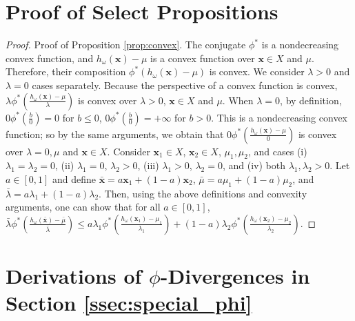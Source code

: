 \documentclass[opre,nonblindrev]{informs3} %
\newcommand{\x}{\mathbf{x}}
\begin{document}
%
 \begin{APPENDICES}

	\section{Proof of Select Propositions}

\begin{proof}{\sc Proof of Proposition \ref{prop:convex}.}
	The conjugate $\phi^*$ is a nondecreasing convex function, and $h_\omega(\x)-\mu$ is a convex function over $\x \in X$ and $\mu$. 
	Therefore, their composition  $\phi^*\left(h_\omega(\x)-\mu\right)$ is convex. 
	We consider $\lambda>0$ and $\lambda =0$ cases separately. 
	Because the perspective of a convex function is convex, $\lambda\phi^*\left(\frac{h_\omega(\x)-\mu}{\lambda}\right)$ is convex over $\lambda>0$,  $\x \in X$ and $\mu$. 
	When $\lambda = 0$, by definition, $0\phi^*\left(\frac{b}{0}\right)= 0$ for $b \leq 0$, $0\phi^*\left(\frac{b}{0}\right)= +\infty$ for $b>0$.  
	This is a nondecreasing convex function; so by the same arguments, we obtain that  $0\phi^*\left(\frac{h_\omega(\x)-\mu}{0}\right)$ is convex over $\lambda=0, \mu$ and $\x \in X$. 
	Consider $\x_1 \in X$, $\x_2 \in X$, $\mu_1,\mu_2$, and cases (i) $\lambda_1=\lambda_2 = 0$, (ii) $\lambda_1= 0$, $\lambda_2>0$, (iii) $\lambda_1 >0$, $\lambda_2 =0$, and (iv) both $\lambda_1, \lambda_2>0$.  
	Let $a \in [0,1]$ and define $\bar{\x}=a \x_1 + (1-a) \x_2$, $\bar{\mu}=a\mu_1 + (1-a)\mu_2$, and $\bar{\lambda}=a \lambda_1 + (1-a)\lambda_2$. 
	Then, using the above definitions and convexity arguments, one can show that for all $a \in [0,1]$, $\bar{\lambda} \phi^*\left(\frac{h_\omega(\bar{\x}) - \bar{\mu}}{\bar{\lambda}}\right) \leq a \lambda_1 \phi^*\left(\frac{h_\omega(\x_1) - \mu_1}{\lambda_1}\right) + (1-a) \lambda_2 \phi^*\left(\frac{h_\omega(\x_2) - \mu_2}{\lambda_2}\right)$.
	\Halmos
\end{proof}



	\section{Derivations of $\phi$-Divergences in Section \ref{ssec:special_phi}}


\end{APPENDICES}
\end{document}
